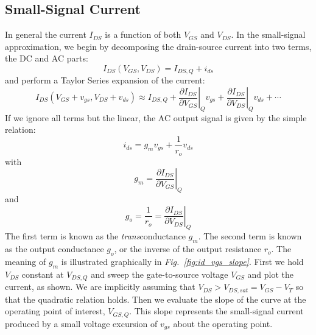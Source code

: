 \subsection{Small-Signal Current}
In general the current $I_{DS}$ is a function of both $V_{GS}$ and $V_{DS}$.  In the small-signal approximation, we begin by decomposing the drain-source current into two terms, the DC and AC parts:
    \begin{equation}
        I_{DS}(V_{GS},V_{DS}) = {I_{DS,Q}} + {i_{ds}}
    \end{equation}
and perform a Taylor Series expansion of the current:
    \begin{equation}
        I_{DS}(V_{GS} + v_{gs},V_{DS} + v_{ds}) \approx I_{DS,Q} + \left. \frac{{\partial {I_{DS}}}} {{\partial {V_{GS}}}} \right|_Q{v_{gs}} + \left. \frac{{\partial {I_{DS}}}}{{\partial {V_{DS}}}} \right|_Q {v_{ds}} + \cdots
    \end{equation}
If we ignore all terms but the linear, the AC output signal is given by the simple relation:
    \begin{equation}
        {i_{ds}} = {g_m}{v_{gs}} + \frac{1}{{{r_o}}}{v_{ds}}
    \end{equation}
with
    \begin{equation}
        g_m = \left. \frac{{\partial {I_{DS}}}} {{\partial {V_{GS}}}} \right|_Q
    \end{equation}
and
    \begin{equation}
        g_o = \frac{1}{r_o} = \left. \frac{{\partial {I_{DS}}}}{{\partial {V_{DS}}}} \right|_Q 
    \end{equation}
The first term is known as the \textit{trans}conductance $g_m$.  The second term is known as the output conductance $g_o$, or the inverse of the output resistance $r_o$.
The meaning of $g_m$ is illustrated graphically in \emph{Fig.~\ref{fig:id_vgs_slope}}.  First we hold $V_{DS}$ constant at $V_{DS,Q}$ and sweep the gate-to-source voltage $V_{GS}$ and plot the current, as shown.   We are implicitly assuming that  $V_{DS} > V_{DS,sat} = V_{GS} - V_T$ so that the quadratic relation holds.  Then we evaluate the slope of the curve at the operating point of interest, $V_{GS,Q}$.  This slope represents the small-signal current produced by a small voltage excursion of $v_{gs}$ about the operating point.
